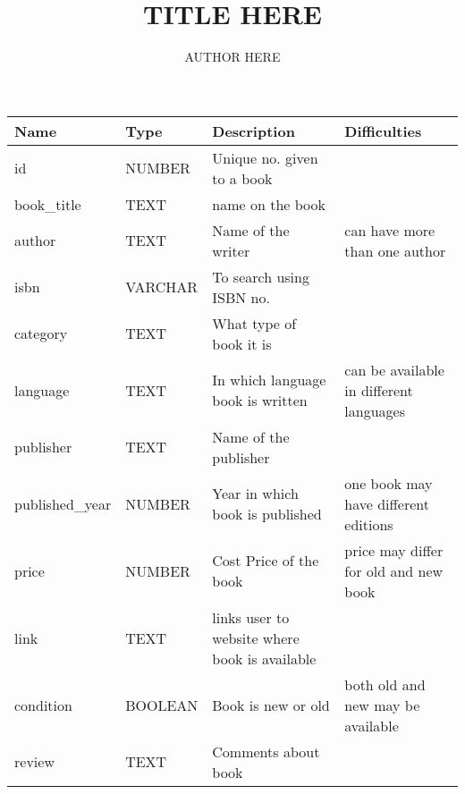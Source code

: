\documentclass[10pt,a4paper]{article}
\title{TITLE HERE}
\author{AUTHOR HERE}
\begin{document}
\maketitle

\begin{tabularx}{\textwidth}{lllX}
\toprule
\textbf{Name} & \textbf{Type} & \textbf{Description} & \textbf{Difficulties}\\
\midrule
id & NUMBER & Unique no. given to a book & \\
book\_title & TEXT & name on the book & \\
author & TEXT & Name of the writer & can have more than one author\\
isbn & VARCHAR & To search using ISBN no. & \\
category & TEXT & What type of book it is & \\
language & TEXT & In which language book is written & can be available in different languages \\
publisher & TEXT & Name of the publisher & \\
published\_year & NUMBER & Year in which book is published & one book may have different editions\\
price & NUMBER & Cost Price of the book & price may differ for old and new book\\
link & TEXT & links user to website where book is available & \\
condition & BOOLEAN & Book is new or old & both old and new may be available \\
review & TEXT & Comments about book & \\
\bottomrule
\end{tabularx}
\end{document}
